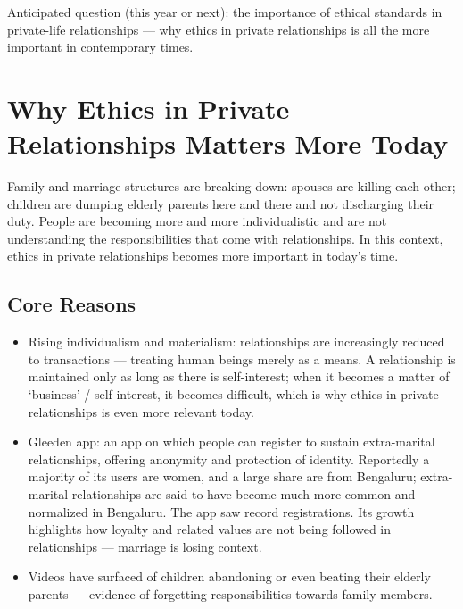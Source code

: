 \begin{PYQLink}
Anticipated question (this year or next): the importance of ethical standards in private-life relationships --- why ethics in private relationships is all the more important in contemporary times.
\end{PYQLink}

\section{Why Ethics in Private Relationships Matters More Today}

Family and marriage structures are breaking down: spouses are killing each other; children are dumping elderly parents here and there and not discharging their duty. People are becoming more and more individualistic and are not understanding the responsibilities that come with relationships. In this context, ethics in private relationships becomes more important in today's time.

\subsection{Core Reasons}

\begin{itemize}
\item Rising individualism and materialism: relationships are increasingly reduced to transactions --- treating human beings merely as a means. A relationship is maintained only as long as there is self-interest; when it becomes a matter of `business' / self-interest, it becomes difficult, which is why ethics in private relationships is even more relevant today.
\end{itemize}

\begin{ExampleBox}
\begin{itemize}
\item Gleeden app: an app on which people can register to sustain extra-marital relationships, offering anonymity and protection of identity. Reportedly a majority of its users are women, and a large share are from Bengaluru; extra-marital relationships are said to have become much more common and normalized in Bengaluru. The app saw record registrations. Its growth highlights how loyalty and related values are not being followed in relationships --- marriage is losing context.
\item Videos have surfaced of children abandoning or even beating their elderly parents --- evidence of forgetting responsibilities towards family members.
\end{itemize}
\end{ExampleBox}


